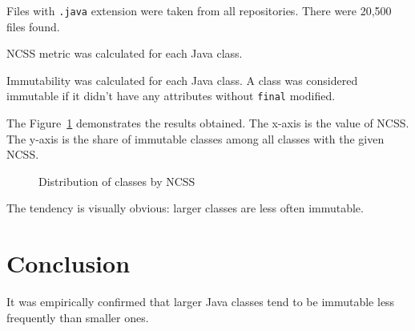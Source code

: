 \documentclass[a4paper,UKenglish,cleveref, autoref]{lipics-v2019}
\begin{document}
Files with \texttt{.java} extension were taken from all repositories.
There were 20,500 files found.

NCSS metric was calculated for each Java class.

Immutability was calculated for each Java class. A class was considered
immutable if it didn't have any attributes without \texttt{final} modified.

The Figure~\ref{fig:1} demonstrates the results obtained. The x-axis is
the value of NCSS. The y-axis is the share of immutable classes among
all classes with the given NCSS.

\begin{figure}[h]
  
  \caption{Distribution of classes by NCSS}
  \label{fig:1}
\end{figure}

The tendency is visually obvious: larger classes are less often immutable.

\section{Conclusion}

It was empirically confirmed that larger Java classes tend to be immutable
less frequently than smaller ones.
\end{document}

